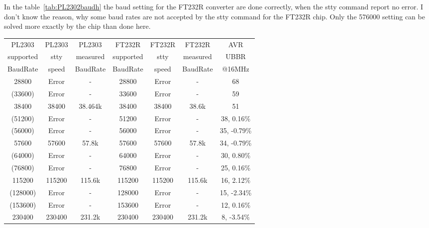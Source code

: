 In the table~\ref{tab:PL2302baudh} the baud setting for the FT232R converter 
are done correctly, when the stty command report no error.
I don't know the reason, why some baud rates are not accepted by the stty command
for the FT232R chip.
Only the 576000 setting can be solved more exactly by the chip than done here.

\begin{table}[H]
  \begin{center}
    \begin{tabular}{| c | c | c || c | c | c || c |}
    \hline
    PL2303     & PL2303 & PL2303   &  FT232R   & FT232R & FT232R    & AVR \\
    supported  & stty  & measured  & supported & stty   & measured  & UBBR  \\
    BaudRate   & speed & BaudRate  & BaudRate  & speed  & BaudRate  & @16MHz \\
    \hline
    \hline
    \hline
      28800  &  Error   &   -       &  28800    & Error  &    -      &   68 \\
    \hline
     (33600) &  Error   &   -       &  33600    & Error  &    -      &   59  \\
    \hline
      38400  &  38400   &  38.464k  &  38400    & 38400  &  38.6k   &   51  \\
    \hline
    (51200)  &  Error   &   -       &  51200    & Error  &    -      &   38,  0.16\%  \\
    \hline
    (56000)  &  Error   &   -       &  56000    & Error  &    -      &   35, -0.79\%  \\
    \hline
      57600  &  57600   &  57.8k    &  57600    & 57600  &  57.8k    &   34, -0.79\%  \\
    \hline
    (64000)  &  Error   &   -       &  64000    & Error  &    -      &   30,  0.80\%  \\
    \hline
    (76800)  &  Error   &   -       &  76800    & Error  &    -      &   25, 0.16\%  \\
    \hline
     115200  &  115200  &  115.6k   &  115200   & 115200 &  115.6k   &   16, 2.12\%  \\
    \hline
    (128000) &  Error   &   -       &  128000   & Error  &    -      &   15, -2.34\%  \\
    \hline
    (153600) &  Error   &   -       &  153600   & Error  &    -      &   12, 0.16\%  \\
    \hline
     230400  &  230400  &  231.2k   &  230400   & 230400 &  231.2k   &   8, -3.54\%  \\

\end{tabular}
\end{center}
\end{table}
